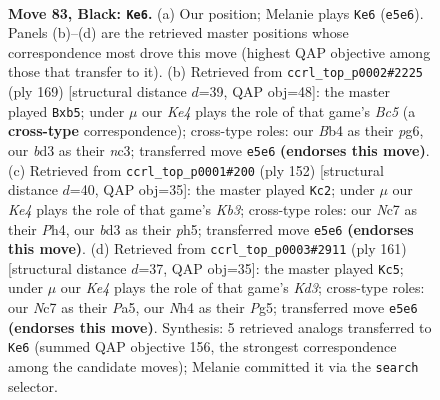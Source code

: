 \documentclass[11pt]{article}
\begin{document}
\clearpage

\begin{figure}[p]\centering
\begin{subfigure}{0.46\textwidth}\centering
\resizebox{\linewidth}{!}{%
\newchessgame
\chessboard[
  setfen={8/1Nn5/8/p3k3/Pb1pP2n/1P1B3p/4P3/2K5 b - - 33 83},
  showmover=false,
  pgfstyle=straightmove, color=movearrow, markmove={e5-e6}
]}
\caption{}
\end{subfigure}\hfill
\begin{subfigure}{0.46\textwidth}\centering
\resizebox{\linewidth}{!}{%
\newchessgame
\chessboard[
  setfen={8/6p1/1k3nPp/1Pp4P/2b2K2/2N2B2/8/8 b - - 18 85},
  showmover=false,
  pgfstyle=straightmove, color=movearrow, markmove={c4-b5}
]}
\caption{}
\end{subfigure}
\\[4pt]
\begin{subfigure}{0.46\textwidth}\centering
\resizebox{\linewidth}{!}{%
\newchessgame
\chessboard[
  setfen={8/8/3k2p1/4p2p/2PbP2P/1KpN2P1/8/8 w - - 6 77},
  showmover=false,
  pgfstyle=straightmove, color=movearrow, markmove={b3-c2}
]}
\caption{}
\end{subfigure}\hfill
\begin{subfigure}{0.46\textwidth}\centering
\resizebox{\linewidth}{!}{%
\newchessgame
\chessboard[
  setfen={8/8/3k4/p2Pp1p1/7p/1B1KPP1P/P7/2b5 b - - 79 81},
  showmover=false,
  pgfstyle=straightmove, color=movearrow, markmove={d6-c5}
]}
\caption{}
\end{subfigure}
\caption{\textbf{Move 83, Black: \texttt{Ke6}.} (a) Our position; Melanie plays \texttt{Ke6} (\texttt{e5e6}). Panels (b)--(d) are the retrieved master positions whose correspondence most drove this move (highest QAP objective among those that transfer to it). (b) Retrieved from \texttt{ccrl\_top\_p0002\#2225} (ply 169) [structural distance $d$=39, QAP obj=48]: the master played \texttt{Bxb5}; under $\mu$ our \emph{Ke4} plays the role of that game's \emph{Bc5} (a \textbf{cross-type} correspondence); cross-type roles: our \emph{B}b4 as their \emph{p}g6, our \emph{b}d3 as their \emph{n}c3; transferred move \texttt{e5e6} \textbf{(endorses this move)}. (c) Retrieved from \texttt{ccrl\_top\_p0001\#200} (ply 152) [structural distance $d$=40, QAP obj=35]: the master played \texttt{Kc2}; under $\mu$ our \emph{Ke4} plays the role of that game's \emph{Kb3}; cross-type roles: our \emph{N}c7 as their \emph{P}h4, our \emph{b}d3 as their \emph{p}h5; transferred move \texttt{e5e6} \textbf{(endorses this move)}. (d) Retrieved from \texttt{ccrl\_top\_p0003\#2911} (ply 161) [structural distance $d$=37, QAP obj=35]: the master played \texttt{Kc5}; under $\mu$ our \emph{Ke4} plays the role of that game's \emph{Kd3}; cross-type roles: our \emph{N}c7 as their \emph{P}a5, our \emph{N}h4 as their \emph{P}g5; transferred move \texttt{e5e6} \textbf{(endorses this move)}. Synthesis: 5 retrieved analogs transferred to \texttt{Ke6} (summed QAP objective 156, the strongest correspondence among the candidate moves); Melanie committed it via the \texttt{search} selector.}
\label{fig:thought-m165}
\end{figure}
\end{document}
